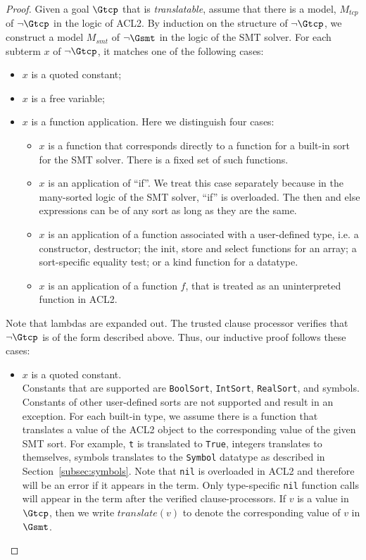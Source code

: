 \begin{proof}
  Given a goal $\Gtcp$ that is \emph{translatable}, assume that there is a
  model, $M_{tcp}$ of $\neg \Gtcp$ in the logic of ACL2.
  By induction on the structure of $\neg \Gtcp$, we construct a model $M_{smt}$
  of $\neg\Gsmt$ in the logic of the SMT solver. For each subterm $x$ of
  $\neg \Gtcp$, it matches one of the following cases:
  \begin{itemize}
  \item $x$ is a quoted constant;
  \item $x$ is a free variable;
  \item $x$ is a function application. Here we distinguish four cases:
    \begin{itemize}
      \item $x$ is a function that corresponds directly to a function for a
        built-in sort for the \acs{SMT} solver. There is a fixed set of such
        functions.
      \item $x$ is an application of ``if''. We treat this case separately
        because in the many-sorted logic of the \acs{SMT} solver, ``if'' is
        overloaded. The then and else expressions can be of any sort as long as
        they are the same. 
      \item $x$ is an application of a function associated with a user-defined
        type, i.e. a constructor, destructor; the init, store and select
        functions for an array; a sort-specific equality test; or a kind
        function for a datatype.
      \item $x$ is an application of a function $f$, that is treated as an
        uninterpreted function in ACL2.
    \end{itemize}
  \end{itemize}
  Note that lambdas are expanded out. The trusted clause processor verifies that
  $\neg \Gtcp$ is of the form described above. Thus, our inductive proof follows
  these cases:
  \begin{itemize}
  \item $x$ is a quoted constant. \\
    Constants that are supported are \texttt{BoolSort}, \texttt{IntSort},
    \texttt{RealSort}, and symbols. Constants of other user-defined sorts are
    not supported and result in an exception. For each built-in type, we assume
    there is a function that translates a value of the ACL2 object to the
    corresponding value of the given \acs{SMT} sort. For example, \texttt{t} is
    translated to \texttt{True}, integers translates to themselves, symbols
    translates to the \texttt{Symbol} datatype as described in
    Section~\ref{subsec:symbols}.
    Note that \texttt{nil} is overloaded in ACL2 and therefore will be an error
    if it appears in the term. Only type-specific \texttt{nil} function calls
    will appear in the term after the verified clause-processors.
    If $v$ is a value in $\Gtcp$, then we write $translate(v)$ to denote the
    corresponding value of $v$ in $\Gsmt$.
    

\end{itemize}
\end{proof}
